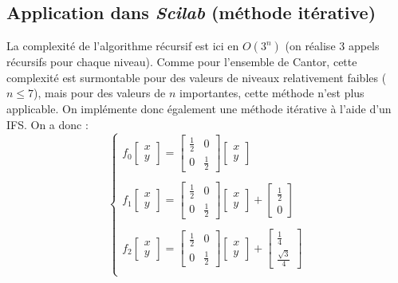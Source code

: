 \documentclass[a4paper,10pt]{report}
\begin{document}
\subsection{Application dans \textit{Scilab} (méthode itérative)}
La complexité de l'algorithme récursif est ici en $O(3^n)$ (on réalise 3 appels récursifs pour chaque niveau). Comme pour l'ensemble de Cantor, cette complexité est surmontable pour des valeurs de niveaux relativement faibles ($n\leq 7$), mais pour des valeurs de $n$ importantes, cette méthode n'est plus applicable. On implémente donc également une méthode itérative à l'aide d'un IFS. On a donc :
\begin{equation}
\left\lbrace
\begin{array}{l}
f_0 \left[ \begin{array}{ll} x \\ y \end{array} \right] =
\left[ \begin{array}{ll} \frac{1}{2} & 0 \\ 0 & \frac{1}{2} \end{array} \right]
\left[ \begin{array}{ll} x \\ y \end{array} \right]\\ \\

f_1 \left[ \begin{array}{ll} x \\ y \end{array} \right] =
\left[ \begin{array}{ll} \frac{1}{2} & 0 \\ 0 & \frac{1}{2} \end{array} \right]
\left[ \begin{array}{ll} x \\ y \end{array} \right]
+ \left[ \begin{array}{ll} \frac{1}{2} \\ 0 \end{array} \right]\\ \\

f_2 \left[ \begin{array}{ll} x \\ y \end{array} \right] =
\left[ \begin{array}{ll} \frac{1}{2} & 0 \\ 0 & \frac{1}{2} \end{array} \right]
\left[ \begin{array}{ll} x \\ y \end{array} \right]
+ \left[ \begin{array}{ll} \frac{1}{4} \\ \frac{\sqrt{3}}{4} \end{array} \right]\\
\end{array}\right.
\end{equation}
\end{document}
